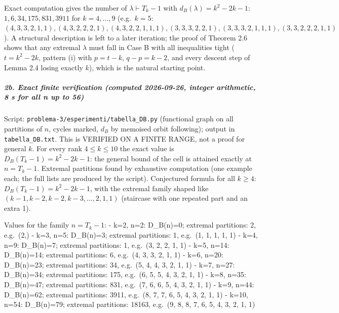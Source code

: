 Exact computation gives the number of \(\lambda\vdash T_k-1\) with
\(d_B(\lambda)=k^2-2k-1\): \(1,6,34,175,831,3911\) for \(k=4,\dots,9\)
(e.g.~\(k=5\):
\((4,3,3,2,1,1),(4,3,2,2,2,1),(4,3,2,2,1,1,1),(3,3,3,2,2,1),(3,3,3,2,1,1,1),(3,3,2,2,2,1,1)\)).
A structural description is left to a later iteration; the proof of
Theorem 2.6 shows that any extremal \(\lambda\) must fall in Case B with
all inequalities tight (\(t=k^2-2k\), pattern (i) with \(p=t-k\),
\(q-p=k-2\), and every descent step of Lemma 2.4 losing exactly \(k\)),
which is the natural starting point.

\subparagraph{2b. Exact finite verification (computed 2026-09-26,
integer arithmetic, 8 s for all n up to
56)}\label{b.-exact-finite-verification-computed-2026-09-26-integer-arithmetic-8-s-for-all-n-up-to-56}

Script: \texttt{problema-3/esperimenti/tabella\_DB.py} (functional graph
on all partitions of \(n\), cycles marked, \(d_B\) by memoised orbit
following); output in \texttt{tabella\_DB.txt}. This is VERIFIED ON A
FINITE RANGE, not a proof for general \(k\). For every rank
\(4\le k\le 10\) the exact value is \(D_B(T_k-1)=k^2-2k-1\): the general
bound of the cell is attained exactly at \(n=T_k-1\). Extremal
partitions found by exhaustive computation (one example each; the full
lists are produced by the script). Conjectured formula for all
\(k\ge4\): \(D_B(T_k-1)=k^2-2k-1\), with the extremal family shaped like
\((k-1,k-2,k-2,k-3,\dots,2,1,1)\) (staircase with one repeated part and
an extra 1).

Values for the family \(n=T_k-1\): - k=2, n=2: D\_B(n)=0; extremal
partitions: 2, e.g.~(2,) - k=3, n=5: D\_B(n)=3; extremal partitions: 1,
e.g.~(1, 1, 1, 1, 1) - k=4, n=9: D\_B(n)=7; extremal partitions: 1,
e.g.~(3, 2, 2, 1, 1) - k=5, n=14: D\_B(n)=14; extremal partitions: 6,
e.g.~(4, 3, 3, 2, 1, 1) - k=6, n=20: D\_B(n)=23; extremal partitions:
34, e.g.~(5, 4, 4, 3, 2, 1, 1) - k=7, n=27: D\_B(n)=34; extremal
partitions: 175, e.g.~(6, 5, 5, 4, 3, 2, 1, 1) - k=8, n=35: D\_B(n)=47;
extremal partitions: 831, e.g.~(7, 6, 6, 5, 4, 3, 2, 1, 1) - k=9, n=44:
D\_B(n)=62; extremal partitions: 3911, e.g.~(8, 7, 7, 6, 5, 4, 3, 2, 1,
1) - k=10, n=54: D\_B(n)=79; extremal partitions: 18163, e.g.~(9, 8, 8,
7, 6, 5, 4, 3, 2, 1, 1)


